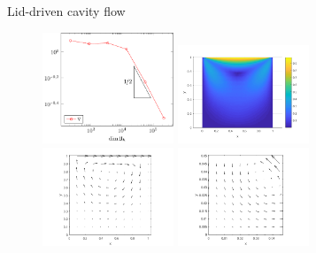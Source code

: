 \documentclass[10pt, compress]{beamer}
\begin{document}
\begin{frame}{ Lid-driven cavity flow}
\begin{figure}
  \begin{center}
  \includegraphics[width=0.35\textwidth]{plots_stokes2.pdf}
  \includegraphics[width=0.35\textwidth]{LidDrivenVfield.png}
    \includegraphics[width=0.35\textwidth]{LidDrivenVortexBig.png}
    \includegraphics[width=0.35\textwidth]{LidDrivenVortexSmall.png}
  \end{center}
\end{figure}
\end{frame}
\end{document}
